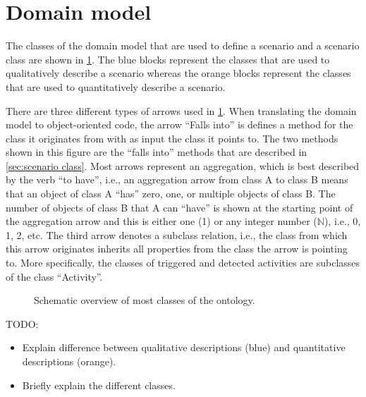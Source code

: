 \section{Domain model}
\label{sec:ontology}


The classes of the domain model that are used to define a scenario and a scenario class are shown in \cref{fig:ontology classes}. The blue blocks represent the classes that are used to qualitatively describe a scenario whereas the orange blocks represent the classes that are used to quantitatively describe a scenario. 

\cbstart
There are three different types of arrows used in \cref{fig:ontology classes}. When translating the domain model to object-oriented code, the arrow ``Falls into'' is defines a method for the class it originates from with as input the class it points to. The two methods shown in this figure are the ``falls into'' methods that are described in \cref{sec:scenario class}. Most arrows represent an aggregation, which is best described by the verb ``to have'', i.e., an aggregation arrow from class A to class B means that an object of class A ``has'' zero, one, or multiple objects of class B. The number of objects of class B that A can ``have'' is shown at the starting point of the aggregation arrow and this is either one (1) or any integer number ($\mathbb{N}$), i.e., 0, 1, 2, etc. The third arrow denotes a subclass relation, i.e., the class from which this arrow originates inherits all properties from the class the arrow is pointing to. More specifically, the classes of triggered and detected activities are subclasses of the class ``Activity''.
\cbend

\begin{figure}
	\centering
	
	\caption{Schematic overview of most classes of the ontology.}
	\label{fig:ontology classes}
\end{figure}


\color{red}
TODO: 
\begin{itemize}
	\item Explain difference between qualitative descriptions (blue) and quantitative descriptions (orange).
	\item Briefly explain the different classes.
\end{itemize}
\color{black}

